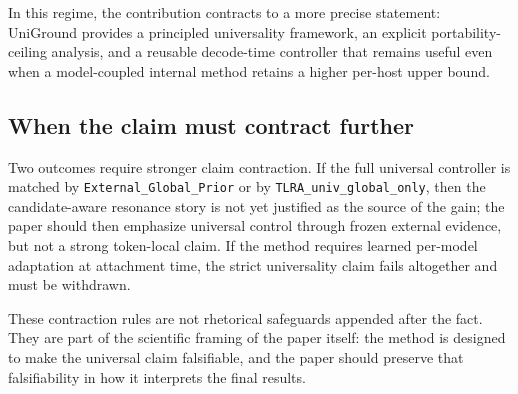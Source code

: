 In this regime, the contribution contracts to a more precise statement: UniGround provides a principled universality framework, an explicit portability-ceiling analysis, and a reusable decode-time controller that remains useful even when a model-coupled internal method retains a higher per-host upper bound.

\subsection{When the claim must contract further}

Two outcomes require stronger claim contraction. If the full universal controller is matched by \texttt{External\_Global\_Prior} or by \texttt{TLRA\_univ\_global\_only}, then the candidate-aware resonance story is not yet justified as the source of the gain; the paper should then emphasize universal control through frozen external evidence, but not a strong token-local claim. If the method requires learned per-model adaptation at attachment time, the strict universality claim fails altogether and must be withdrawn.

These contraction rules are not rhetorical safeguards appended after the fact. They are part of the scientific framing of the paper itself: the method is designed to make the universal claim falsifiable, and the paper should preserve that falsifiability in how it interprets the final results.
